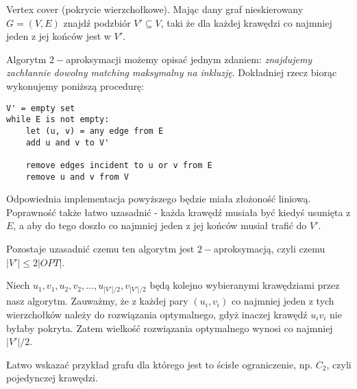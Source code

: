 Vertex cover (pokrycie wierzchołkowe). Mając dany graf nieskierowany $G=(V,E)$ znajdź podzbiór $V' \subseteq V$, taki że dla każdej krawędzi co najmniej jeden z jej końców jest w $V'$.

Algorytm $2-$aproksymacji możemy opisać jednym zdaniem: \textit{znajdujemy zachłannie dowolny matching maksymalny na inkluzję}. Dokładniej rzecz biorąc wykonujemy poniższą procedurę:

\begin{verbatim}
V' = empty set
while E is not empty:
    let (u, v) = any edge from E
    add u and v to V'
    
    remove edges incident to u or v from E
    remove u and v from V
\end{verbatim}

Odpowiednia implementacja powyższego będzie miała złożoność liniową. Poprawność także łatwo uzasadnić - każda krawędź musiała być kiedyś usunięta z $E$, a aby do tego doszło co najmniej jeden z jej końców musiał trafić do $V'$.

Pozostaje uzasadnić czemu ten algorytm jest $2-$aproksymacją, czyli czemu \(|V'| \leqslant 2 |OPT|\).

Niech $u_1, v_1, u_2, v_2, \ldots, u_{|V'|/2}, v_{|V'|/2}$ będą kolejno wybieranymi krawędziami przez nasz algorytm. Zauważmy, że z każdej pary $(u_i, v_i)$ co najmniej jeden z tych wierzchołków należy do rozwiązania optymalnego, gdyż inaczej krawędź $u_iv_i$ nie byłaby pokryta. Zatem wielkość rozwiązania optymalnego wynosi co najmniej $|V'|/2$.

Łatwo wskazać przykład grafu dla którego jest to ścisłe ograniczenie, np. $C_2$, czyli pojedynczej krawędzi.